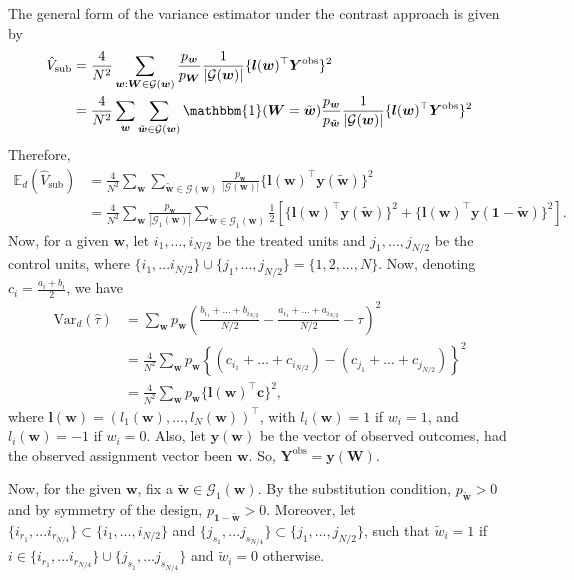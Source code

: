 \documentclass[12pt]{article}
\newcommand{\Var}{{\text{Var}}}
\newcommand{\E}{{\mathbb{E}}}
\begin{document}
The general form of the variance estimator under the contrast approach is given by
    \begin{align}
        \hat{V}_{\text{sub}} &= \frac{4}{N^2}\sum_{\bm{w}:\bm{W} \in \mathcal{G}(\bm{w})} \frac{p_{\bm{w}}}{p_{\bm{W}}} \frac{1}{|\mathcal{G}(\bm{w})|}\{\bm{l}(\bm{w})^\top \bm{Y}^{\text{obs}}\}^2 \nonumber \\
        &= \frac{4}{N^2}\sum_{\bm{w}} \sum_{\tilde{\bm{w}} \in \mathcal{G}(\bm{w})} \mathbbm{1}(\bm{W} = \tilde{\bm{w}})\frac{p_{\bm{w}}}{p_{\tilde{\bm{w}}}} \frac{1}{|\mathcal{G}(\bm{w})|}\{\bm{l}(\bm{w})^\top \bm{Y}^{\text{obs}}\}^2
    \end{align}
Therefore, 
\begin{align}
    \E_d(\hat{V}_{\text{sub}}) &= \frac{4}{N^2}\sum_{\bm{w}} \sum_{\tilde{\bm{w}} \in \mathcal{G}(\bm{w})} \frac{p_{\bm{w}}}{|\mathcal{G}(\bm{w})|}\{\bm{l}(\bm{w})^\top \bm{y}(\tilde{\bm{w}})\}^2 \nonumber \\
    & = \frac{4}{N^2}\sum_{\bm{w}}\frac{p_{\bm{w}}}{|\mathcal{G}_1(\bm{w})|} \sum_{\tilde{\bm{w}} \in \mathcal{G}_1(\bm{w})} \frac{1}{2}\left[\{\bm{l}(\bm{w})^\top \bm{y}(\tilde{\bm{w}})\}^2 + \{\bm{l}(\bm{w})^\top \bm{y}(\bm{1} - \tilde{\bm{w}})\}^2\right].
    \label{eq_A_evhat}
\end{align}
Now, for a given $\bm{w}$, let $i_1,...,i_{N/2}$ be the treated units and $j_1,...,j_{N/2}$ be the control units, where $\{i_1,...i_{N/2}\} \cup \{j_1,...,j_{N/2}\} = \{1,2,...,N\}$. Now, denoting $c_i = \frac{a_i + b_i}{2}$, we have 
    \begin{align}
        \Var_d(\hat{\tau}) &= \sum_{\bm{w}}p_{\bm{w}} \left(\frac{b_{i_1}+ ...+ b_{i_{N/2}}}{N/2} - \frac{a_{i_1}+ ...+ a_{i_{N/2}}}{N/2} - \tau \right)^2 \nonumber \\
        &= \frac{4}{N^2}\sum_{\bm{w}}p_{\bm{w}} \left\{(c_{i_1}+ ...+ c_{i_{N/2}}) - (c_{j_1}+ ...+ c_{j_{N/2}})\right\}^2 \label{eq_A_sub1}\\
        & = \frac{4}{N^2}\sum_{\bm{w}}p_{\bm{w}} \{\bm{l}(\bm{w})^\top \bm{c}\}^2, \label{eq_A_sub2}
    \end{align}
where $\bm{l}(\bm{w}) = (l_1(\bm{w}),...,l_N(\bm{w}))^\top$, with $l_i(\bm{w}) = 1$ if $w_i = 1$, and $l_i(\bm{w}) = -1$ if $w_i = 0$. Also, let $\bm{y}(\bm{w})$ be the vector of observed outcomes, had the observed assignment vector been $\bm{w}$. So, $\bm{Y}^{\text{obs}} = \bm{y}(\bm{W})$.

Now, for the given $\bm{w}$, fix a $\tilde{\bm{w}} \in \mathcal{G}_1(\bm{w})$. By the substitution condition, $p_{\tilde{\bm{w}}}>0$ and by symmetry of the design, $p_{\bm{1} - \tilde{\bm{w}}}>0$. Moreover, let
$\{i_{r_1},...i_{r_{N/4}}\} \subset \{i_1,...,i_{N/2}\}$ and $\{j_{s_1},...j_{s_{N/4}}\} \subset \{j_1,...,j_{N/2}\}$, such that $\tilde{w}_{i} = 1$ if $i \in \{i_{r_1},...i_{r_{N/4}}\} \cup \{j_{s_1},...j_{s_{N/4}}\}$ and $\tilde{w}_i = 0$ otherwise.  
\end{document}
